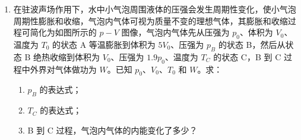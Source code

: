 \documentclass[\gkver]{gaokaozhenti}
\begin{document}
\begin{enumerate}
{（3）设待测盐水的电阻为 $R_{0}$，根据闭合电路欧姆定律，开关 $\mathrm{S}_{2}$ 断开时

$E = I_{1}\left(R_{0} + R_{2} + \frac{R_{3}R_{4}}{R_{3} + R_{4}}\right)$

开关 $\mathrm{S}_{2}$ 闭合时

$E = I_{2}\left(R_{0} + \frac{R_{1}R_{2}}{R_{1} + R_{2}} + \frac{R_{3}R_{4}}{R_{3} + R_{4}}\right)$

代入数据解得 $R_{0} = 100 \UO$
}

\item
在驻波声场作用下，水中小气泡周围液体的压强会发生周期性变化，使小气泡周期性膨胀和收缩，气泡内气体可视为质量不变的理想气体，其膨胀和收缩过程可简化为如图所示的 $p - V$ 图像，气泡内气体先从压强为 $p_{0}$、体积为 $V_{0}$、温度为 $T_{0}$ 的状态 A 等温膨胀到体积为 $5V_{0}$、压强为 $p_{B}$ 的状态 B，然后从状态 B 绝热收缩到体积为 $V_{0}$、压强为 $1.9p_{0}$、温度为 $T_{C}$ 的状态 C，B 到 C 过程中外界对气体做功为 $W$。已知 $p_{0}$、$V_{0}$、$T_{0}$ 和 $W$。求：

\begin{enumerate}
	\item
	$p_{B}$ 的表达式；
	\item
	$T_{C}$ 的表达式；
	\item
	B 到 C 过程，气泡内气体的内能变化了多少？
\end{enumerate}




\end{enumerate}
\end{document}

